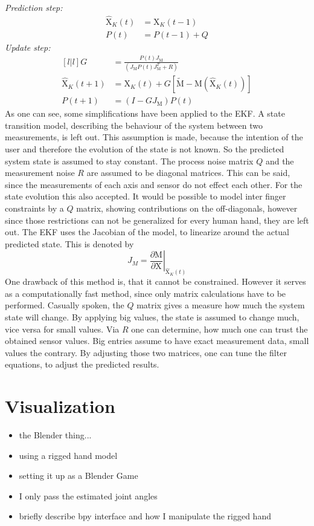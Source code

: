 \emph{Prediction step:} 
\begin{equation}
\begin{aligned}
\hat{\mathrm{X}}_{K}(t) &= \mathrm{X}_{K}(t-1)\\
P(t) &= P(t-1) + Q
\end{aligned}
\end{equation}
\emph{Update step:}
\begin{equation}
\begin{aligned}[l|l]
G &= \frac{P(t) J_{\mathrm{M}}}{(J_{\mathrm{M}} P(t) J_{\mathrm{M}}^{T} + R)} \\
\hat{\mathrm{X}}_{K}(t+1) &= \mathrm{X}_{K}(t) + G[\tilde{\mathrm{M}} - \mathrm{M}(\hat{\mathrm{X}}_{K}(t))]\\
P(t+1) &= (I - G J_{\mathrm{M}}) P(t)
\end{aligned}
\end{equation}
As one can see, some simplifications have been applied to the \ac{EKF}. A state transition model, describing the behaviour of the system between two measurements, is left out. This assumption is made, because the intention of the user and therefore the evolution of the state is not known. So the predicted system state is assumed to stay constant. The process noise matrix $ Q $ and the measurement noise $ R $ are assumed to be diagonal matrices. This can be said, since the measurements of each axis and sensor do not effect each other. For the state evolution this also accepted. It would be possible to model inter finger constraints by a $ Q $ matrix, showing contributions on the off-diagonals, however since those restrictions can not be generalized for every human hand, they are left out. The \ac{EKF} uses the Jacobian of the model, to linearize around the actual predicted state. This is denoted by 
\begin{equation}
J_{M} = \left . \frac{\partial \mathrm{M}}{\partial \mathrm{X}} \right \vert _{\hat{\mathrm{X}}_{K}(t)}  
\end{equation}
One drawback of this method is, that it cannot be constrained. However it serves as a computationally fast method, since only matrix calculations have to be performed. Casually spoken, the $ Q $ matrix gives a measure how much the system state will change. By applying big values, the state is assumed to change much, vice versa for small values. Via $ R $ one can determine, how much one can trust the obtained sensor values. Big entries assume to have exact measurement data, small values the contrary. By adjusting those two matrices, one can tune the filter equations, to adjust the predicted results.





\section{Visualization} \label{sec:visual}

\begin{itemize}
\item the Blender thing...
\item using a rigged hand model
\item setting it up as a Blender Game
\item I only pass the estimated joint angles
\item briefly describe bpy interface and how I manipulate the rigged hand
\end{itemize}




